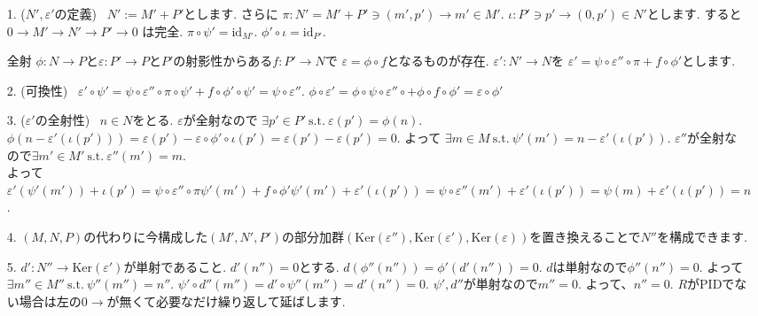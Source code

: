 \documentclass{jsarticle}
\def\Ker{\mathrm{Ker}}
\def\id{\mathrm{id}}
\def\suchthat{\mathrm{\ s.t.\ }}
\theoremstyle{definition}
\numberwithin{theorem}{section}
\begin{document}
\begin{itemize}
\item[1. ($N', \varepsilon'$の定義)]\ $N' := M'+P'$とします. さらに $\pi: N'=M'+P'\ni(m', p') \rightarrow m' \in M'$.
$\iota:P'\ni p'\rightarrow (0, p') \in N'$とします. すると $0 \rightarrow M' \rightarrow N' \rightarrow P' \rightarrow 0$
は完全. $\pi\circ \psi' = \id_{M'}$. $\phi'\circ\iota = \id_{P'}$.

全射 $\phi: N\rightarrow P$と$\varepsilon: P'\rightarrow P$と$P'$の射影性からある$f: P'\rightarrow N$で
$\varepsilon = \phi\circ f$となるものが存在. $\varepsilon':N' \rightarrow N$を
$\varepsilon'=\psi\circ\varepsilon''\circ\pi+f\circ\phi'$とします.

\item[2. (可換性)]\ $\varepsilon'\circ\psi' = \psi\circ\varepsilon''\circ\pi\circ\psi' + f\circ\phi'\circ\psi' = \psi\circ\varepsilon''$.
$\phi\circ\varepsilon' = \phi\circ\psi\circ\varepsilon''\circ+\phi\circ f\circ\phi' = \varepsilon\circ\phi'$

\item[3. ($\varepsilon'$の全射性)]\ $n\in N$をとる. $\varepsilon$が全射なので
$\exists p' \in P' \suchthat \varepsilon(p') = \phi(n)$. $\phi(n-\varepsilon'(\iota(p'))) = \varepsilon(p') - \varepsilon\circ\phi'\circ\iota(p') = \varepsilon(p') - \varepsilon(p') = 0$. よって $\exists m \in M \suchthat \psi'(m') = n-\varepsilon'(\iota(p'))$. $\varepsilon''$が全射なので$\exists m'\in M' \suchthat \varepsilon''(m') = m$.\\
よって $\varepsilon'(\psi'(m')) + \iota(p') = \psi\circ\varepsilon''\circ\pi\psi'(m') + f\circ\phi'\psi'(m') + \varepsilon'(\iota(p')) = \psi\circ\varepsilon''(m') + \varepsilon'(\iota(p')) = \psi(m) + \varepsilon'(\iota(p')) = n$.

\item[4. ] $(M, N, P)$の代わりに今構成した$(M', N', P')$の部分加群$(\Ker(\varepsilon''), \Ker(\varepsilon'), \Ker(\varepsilon))$を置き換えることで$N''$を構成できます. 

\item[5. ] $d': N'' \rightarrow \Ker(\varepsilon')$が単射であること. $d'(n'') = 0$とする. $d(\phi''(n'')) = \phi'(d'(n'')) = 0$. $d$は単射なので$\phi''(n'') = 0$. よって$\exists m'' \in M'' \suchthat \psi''(m'') = n''$. $\psi'\circ d''(m'') = d'\circ\psi''(m'') = d'(n'') = 0$. $\psi', d''$が単射なので$m'' = 0$. よって、$n'' = 0$. $R$がPIDでない場合は左の$0 \rightarrow$が無くて必要なだけ繰り返して延ばします. 
\end{itemize}
\end{document}
